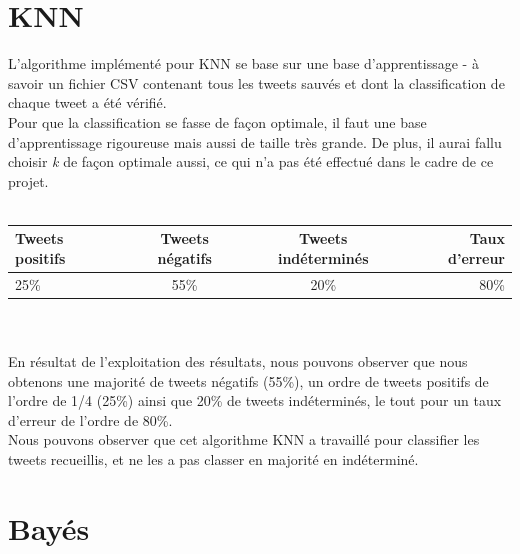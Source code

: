 \documentclass[pdftex,12pt,a4paper]{report}
\begin{document}
\begin{spacing}{1.2}
\section{KNN}

L'algorithme implémenté pour KNN se base sur une base d'apprentissage - à savoir un fichier CSV contenant tous les tweets sauvés et dont la classification de chaque tweet a été vérifié.
\\
Pour que la classification se fasse de façon optimale, il faut une base d'apprentissage rigoureuse mais aussi de taille très grande. De plus, il aurai fallu choisir \textit{k} de façon optimale aussi, ce qui n'a pas été effectué dans le cadre de ce projet.
\\
\\
\begin{tabular}{|l|c|c|r|}
  \hline
  \textbf{Tweets positifs} & \textbf{Tweets négatifs} & \textbf{Tweets indéterminés} & \textbf{Taux d'erreur}\\
  \hline
  25\% & 55\% & 20\% & 80\%\\
  \hline
\end{tabular}
\\
\\
En résultat de l'exploitation des résultats, nous pouvons observer que nous obtenons une majorité de tweets négatifs (55\%), un ordre de tweets positifs de l'ordre de 1/4 (25\%) ainsi que 20\% de tweets indéterminés, le tout pour un taux d'erreur de l'ordre de 80\%.
\\
Nous pouvons observer que cet algorithme KNN a travaillé pour classifier les tweets recueillis, et ne les a pas classer en majorité en indéterminé.

\section{Bayés}


\end{spacing}
\end{document}
